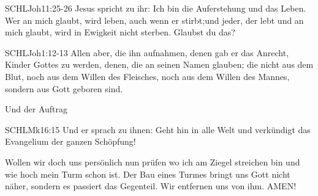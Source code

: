 \documentclass[14pt]{../../inc/mybib}
\begin{document}
    \begin{bibelbox}{SCHL}{Joh}{11:25-26}
        Jesus spricht zu ihr: Ich bin die Auferstehung und das Leben. Wer an mich glaubt, wird leben, auch wenn er stirbt;und jeder, der lebt und an mich glaubt, wird in Ewigkeit nicht sterben. Glaubst du das?
    \end{bibelbox} 
    \begin{bibelbox}{SCHL}{Joh}{1:12-13}
        Allen aber, die ihn aufnahmen, denen gab er das Anrecht, Kinder Gottes zu werden, denen, die an seinen Namen glauben;
        die nicht aus dem Blut, noch aus dem Willen des Fleisches, noch aus dem Willen des Mannes, sondern aus Gott geboren sind.
    \end{bibelbox}     
    Und der Auftrag
    \begin{bibelbox}{SCHL}{Mk}{16:15}
        Und er sprach zu ihnen: Geht hin in alle Welt und verkündigt das Evangelium der ganzen Schöpfung!
    \end{bibelbox} 
    Wollen wir doch uns persönlich nun prüfen wo ich am Ziegel streichen bin und wie hoch mein Turm schon ist. Der Bau eines Turmes bringt uns Gott nicht näher, sondern es passiert das Gegenteil. Wir entfernen uns von ihm. AMEN!
    
    \beten{}   
    
\end{document}
